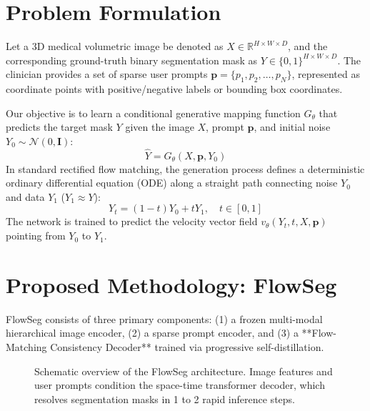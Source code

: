 \documentclass[10.1005,journal]{IEEEtran}
\begin{document}
\section{Problem Formulation}
Let a 3D medical volumetric image be denoted as $X \in \mathbb{R}^{H \times W \times D}$, and the corresponding ground-truth binary segmentation mask as $Y \in \{0, 1\}^{H \times W \times D}$. The clinician provides a set of sparse user prompts $\mathbf{p} = \{p_1, p_2, \dots, p_N\}$, represented as coordinate points with positive/negative labels or bounding box coordinates.

Our objective is to learn a conditional generative mapping function $G_\theta$ that predicts the target mask $Y$ given the image $X$, prompt $\mathbf{p}$, and initial noise $Y_0 \sim \mathcal{N}(0, \mathbf{I})$:
$$\hat{Y} = G_\theta(X, \mathbf{p}, Y_0)$$
In standard rectified flow matching, the generation process defines a deterministic ordinary differential equation (ODE) along a straight path connecting noise $Y_0$ and data $Y_1$ ($Y_1 \approx Y$):
$$Y_t = (1 - t)Y_0 + t Y_1, \quad t \in [0, 1]$$
The network is trained to predict the velocity vector field $v_\theta(Y_t, t, X, \mathbf{p})$ pointing from $Y_0$ to $Y_1$.

\section{Proposed Methodology: FlowSeg}
FlowSeg consists of three primary components: (1) a frozen multi-modal hierarchical image encoder, (2) a sparse prompt encoder, and (3) a **Flow-Matching Consistency Decoder** trained via progressive self-distillation.

\begin{figure}[htbp]
\centering
{}
\caption{Schematic overview of the FlowSeg architecture. Image features and user prompts condition the space-time transformer decoder, which resolves segmentation masks in 1 to 2 rapid inference steps.}
\label{fig:architecture}
\end{figure}
\end{document}
